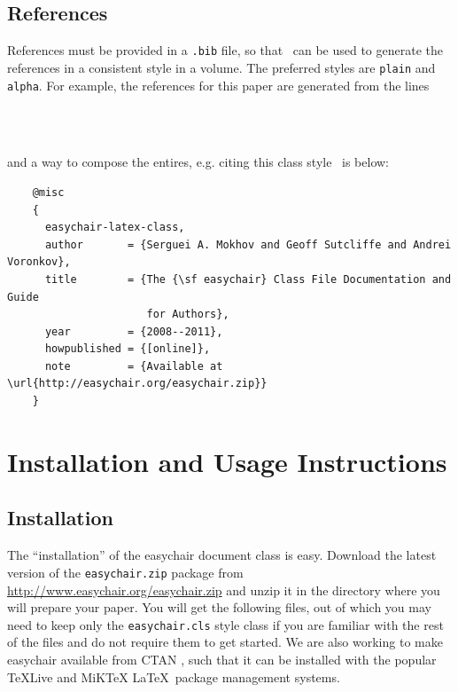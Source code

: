 \documentclass{imav2013}
\newcommand{\easychair}{\textsf{easychair}}
\newcommand{\miktex}{MiK{\TeX}}
\begin{document}
\subsection{References}
\label{sect:references}

References must be provided in a {\tt .bib} file, so that \BibTeX\ can
be used to generate the references in a consistent style in a volume.
The preferred styles are {\tt plain} and {\tt alpha}.
For example, the references for this paper are generated from the
lines
\begin{verbatim}
    
    
\end{verbatim}
and a way to compose the entires, e.g. citing this class style~\cite{easychair-latex-class}
is below:
\tiny
\begin{verbatim}
    @misc
    {
      easychair-latex-class,
      author       = {Serguei A. Mokhov and Geoff Sutcliffe and Andrei Voronkov},
      title        = {The {\sf easychair} Class File Documentation and Guide
                      for Authors},
      year         = {2008--2011},
      howpublished = {[online]},
      note         = {Available at \url{http://easychair.org/easychair.zip}}
    }
\end{verbatim}
\normalsize

\section{Installation and Usage Instructions}
\label{sect:installation-usage}

\subsection{Installation}

The ``installation'' of the {\easychair} document class is easy.
Download the latest version of the \texttt{easychair.zip} package 
from \url{http://www.easychair.org/easychair.zip}
and unzip it in the directory where you will prepare your paper.
You will get the following files, out of which you may need to keep only 
the \texttt{easychair.cls} style class if you are familiar with the rest 
of the files and do not require them to get started.
We are also working to make {\easychair} available from CTAN \cite{ctan},
such that it can be installed with the popular \TeX Live \cite{texlive} and
{\miktex} \cite{miktex} \LaTeX\ package management systems.
\end{document}
